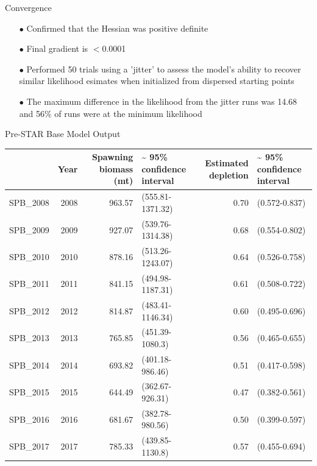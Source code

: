 \documentclass[ignorenonframetext,]{beamer}
\begin{document}
\begin{frame}{Convergence}

\begin{itemize}
\item[$\bullet$] Confirmed that the Hessian was positive definite
\item[$\bullet$] Final gradient is $<$0.0001
\item[$\bullet$] Performed 50 trials using a 'jitter' to assess the model's ability to recover similar likelihood esimates when initialized from dispersed starting points
\item[$\bullet$] The maximum difference in the likelihood from the jitter runs was 14.68 and 56\% of runs were at the minimum likelihood
\end{itemize}

\end{frame}

\begin{frame}{Pre-STAR Base Model Output}

\begin{table}[ht]
\centering
\begin{tabular}{rrrlrl}
  \hline
 & Year & Spawning biomass (mt) & \~{} 95\% confidence interval & Estimated depletion & \~{} 95\% confidence interval \\ 
  \hline
SPB\_2008 & 2008 & 963.57 & (555.81-1371.32) & 0.70 & (0.572-0.837) \\ 
  SPB\_2009 & 2009 & 927.07 & (539.76-1314.38) & 0.68 & (0.554-0.802) \\ 
  SPB\_2010 & 2010 & 878.16 & (513.26-1243.07) & 0.64 & (0.526-0.758) \\ 
  SPB\_2011 & 2011 & 841.15 & (494.98-1187.31) & 0.61 & (0.508-0.722) \\ 
  SPB\_2012 & 2012 & 814.87 & (483.41-1146.34) & 0.60 & (0.495-0.696) \\ 
  SPB\_2013 & 2013 & 765.85 & (451.39-1080.3) & 0.56 & (0.465-0.655) \\ 
  SPB\_2014 & 2014 & 693.82 & (401.18-986.46) & 0.51 & (0.417-0.598) \\ 
  SPB\_2015 & 2015 & 644.49 & (362.67-926.31) & 0.47 & (0.382-0.561) \\ 
  SPB\_2016 & 2016 & 681.67 & (382.78-980.56) & 0.50 & (0.399-0.597) \\ 
  SPB\_2017 & 2017 & 785.33 & (439.85-1130.8) & 0.57 & (0.455-0.694) \\ 
   \hline
\end{tabular}
\end{table}

\end{frame}
\end{document}
